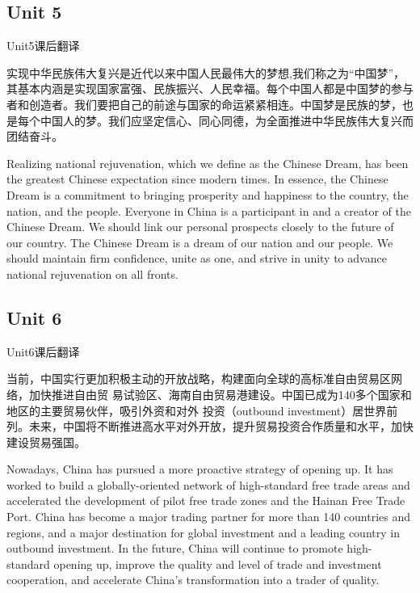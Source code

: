 \subsection{Unit 5}

\begin{question}{Unit5课后翻译}

实现中华民族伟大复兴是近代以来中国人民最伟大的梦想,我们称之为“中国梦”，其基本内涵是实现国家富强、民族振兴、人民幸福。每个中国人都是中国梦的参与者和创造者。我们要把自己的前途与国家的命运紧紧相连。中国梦是民族的梦，也是每个中国人的梦。我们应坚定信心、同心同德，为全面推进中华民族伟大复兴而团结奋斗。
\end{question}

\begin{solution}

Realizing national rejuvenation, which we define as the Chinese Dream, has been the greatest Chinese expectation since modern times. In essence, the Chinese Dream is a commitment to bringing prosperity and happiness to the country, the nation, and the people. Everyone in China is a participant in and a creator of the Chinese Dream. We should link our personal prospects closely to the future of our country. The Chinese Dream is a dream of our nation and our people. We should maintain firm confidence, unite as one, and strive in unity to advance national rejuvenation on all fronts.

\end{solution}


\subsection{Unit 6}

\begin{question}{Unit6课后翻译}

当前，中国实行更加积极主动的开放战略，构建面向全球的高标准自由贸易区网络，加快推进自由贸 易试验区、海南自由贸易港建设。中国已成为140多个国家和地区的主要贸易伙伴，吸引外资和对外 投资（outbound investment）居世界前列。未来，中国将不断推进高水平对外开放，提升贸易投资合作质量和水平，加快建设贸易强国。

\end{question}

\begin{solution}

Nowadays, China has pursued a more proactive strategy of opening up. It has worked to build a globally-oriented network of high-standard free trade areas and accelerated the development of pilot free trade zones and the Hainan Free Trade Port. China has become a major trading partner for more than 140 countries and regions, and a major destination for global investment and a leading country in outbound investment. In the future, China will continue to promote high-standard opening up, improve the quality and level of trade and investment cooperation, and accelerate China’s transformation into a trader of quality.


\end{solution}

